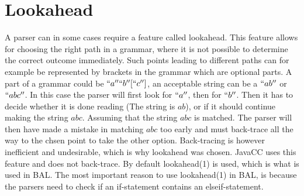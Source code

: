 \section{Lookahead} \label{sec:lookahead}
A parser can in some cases require a feature called lookahead. This feature allows for choosing the right path in a grammar, where it is not possible to determine the correct outcome immediately. Such points leading to different paths can for example be represented by brackets in the grammar which are optional parts. 
A part of a grammar could be $``a'' ``b'' [``c'']$, an acceptable string can be a $``ab''$ or $``abc''$. In this case the parser will first look for $``a''$, then for $``b''$. Then it has to decide whether it is done reading (The string is $ab$), or if it should continue making the string $abc$. Assuming that the string $abc$ is matched. The parser will then have made a mistake in matching $abc$ too early and must back-trace all the way to the chsen point to take the other option. 
Back-tracing is however inefficient and undesirable, which is why lookahead was chosen. JavaCC uses this feature and does not back-trace. By default lookahead(1) is used, which is what is used in BAL. 
The most important reason to use lookahead(1) in BAL, is because the parsers need to check if an if-statement contains an elseif-statement. 